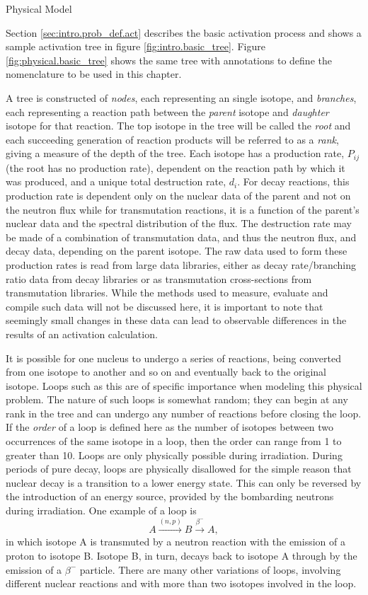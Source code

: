 \begin{chapter}{Physical Model\label{chap:physical}}

Section \ref{sec:intro.prob_def.act} describes the basic activation
process and shows a sample activation tree in figure
\ref{fig:intro.basic_tree}.  Figure \ref{fig:physical.basic_tree} shows
the same tree with annotations to define the nomenclature to be used
in this chapter.

A tree is constructed of \textsl{nodes}, each representing an single
isotope, and \textsl{branches}, each representing a reaction path
between the \textsl{parent} isotope and \textsl{daughter} isotope for
that reaction.  The top isotope in the tree will be called the
\textsl{root} and each succeeding generation of reaction products will
be referred to as a \textsl{rank}, giving a measure of the depth of
the tree.  Each isotope has a production rate, $P_{ij}$ (the root has
no production rate), dependent on the reaction path by which it was
produced, and a unique total destruction rate, $d_i$.  For decay
reactions, this production rate is dependent only on the nuclear data
of the parent and not on the neutron flux while for transmutation
reactions, it is a function of the parent's nuclear data and the
spectral distribution of the flux.  The destruction rate may be made
of a combination of transmutation data, and thus the neutron flux, and
decay data, depending on the parent isotope.  The raw data used to
form these production rates is read from large data libraries, either
as decay rate/branching ratio data from decay libraries or as
transmutation cross-sections from transmutation libraries.  While the
methods used to measure, evaluate and compile such data will not be
discussed here, it is important to note that seemingly small changes
in these data can lead to observable differences in the results of an
activation calculation.

It is possible for one nucleus to undergo a series of reactions, being
converted from one isotope to another and so on and eventually back to
the original isotope.  Loops such as this are of specific importance
when modeling this physical problem.  The nature of such loops is
somewhat random; they can begin at any rank in the tree and can
undergo any number of reactions before closing the loop.  If the
\textsl{order} of a loop is defined here as the number of isotopes
between two occurrences of the same isotope in a loop, then the order
can range from 1 to greater than 10.  Loops are only physically
possible during irradiation.  During periods of pure decay, loops are
physically disallowed for the simple reason that nuclear decay is a
transition to a lower energy state.  This can only be reversed by the
introduction of an energy source, provided by the bombarding neutrons
during irradiation.  One example of a loop is
$$A \stackrel{(n,p)}{\longrightarrow} B
\stackrel{\beta^-}{\longrightarrow} A,$$
in which isotope A is transmuted by a neutron reaction with the
emission of a proton to isotope B.  Isotope B, in turn, decays back to
isotope A through by the emission of a $\beta^-$ particle.  There are
many other variations of loops, involving different nuclear reactions
and with more than two isotopes involved in the loop.
    

\end{chapter}
